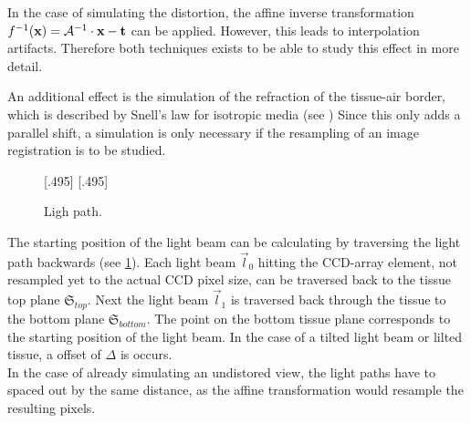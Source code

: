 In the case of simulating the distortion, the affine inverse transformation $f^{-1}(\mathbf{x}) = \mathcal{A}^{-1} \cdot \mathbf{x} - \mathbf{t}$ can be applied.
However, this leads to interpolation artifacts.
Therefore both techniques exists to be able to study this effect in more detail.
\par
% 
An additional effect is the simulation of the refraction of the tissue-air border, which is described by Snell's law for isotropic media (see \dummy{})
Since this only adds a parallel shift, a simulation is only necessary if the resampling of an image registration is to be studied.
\par
% 
\begin{figure}[!t]
\def\tikzwidth{0.42\textwidth}
[.495\textwidth]{
\def\tilt{0}
\def\nindex{2.25}
}\hfill
{}[.495\textwidth]{
}
\caption[Light path]{Ligh path.}
\label{fig:tilted_side_view}
\end{figure}
% 
The starting position of the light beam can be calculating by traversing the light path backwards (see \cref{fig:tilted_side_view}).
Each light beam $\vec{l}_0$ hitting the \ac{CCD}-array element, not resampled yet to the actual \ac{CCD} pixel size, can be traversed back to the tissue top plane $\mathfrak{S}_{top}$.
Next the light beam $\vec{l}_1$ is traversed back through the tissue to the bottom plane $\mathfrak{S}_{bottom}$.
The point on the bottom tissue plane corresponds to the starting position of the light beam.
In the case of a tilted light beam or lilted tissue, a offset of $\Delta$ is occurs.
\\
% 
In the case of already simulating an undistored view, the light paths have to spaced out by the same distance, as the affine transformation would resample the resulting pixels.
% 
\begin{lstfloat}[!ht]
	
	\caption{Pseudocode simulation }
	\label{alg:simulation}
\end{lstfloat}
% 
